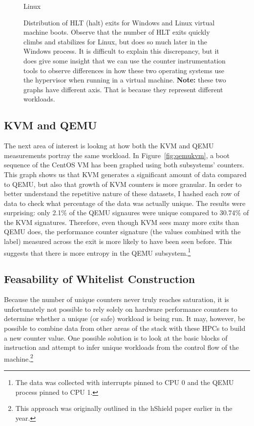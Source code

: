 \documentclass[notitlepage]{article}
\begin{document}
\begin{figure}[htpb!]
\begin{minipage}{0.5\textwidth}
        Linux
    \end{minipage}
    \caption{Distribution of HLT (halt) exits for Windows and Linux virtual
        machine boots. Observe that the number of HLT exits quickly climbs and
        stabilizes for Linux, but does so much later in the Windows process. It
        is difficult to explain this discrepancy, but it does give some insight
        that we can use the counter instrumentation tools to observe differences
        in how these two operating systems use the hypervisor when running in a
        virtual machine. \textbf{Note:} these two graphs have different axis.
    That is because they represent different workloads.} \label{fig:winlinhlt}
\end{figure}

\subsection{KVM and QEMU}
The next area of interest is lookng at how both the KVM and QEMU measurements
portray the same workload. In Figure~\ref{fig:qemukvm}, a boot sequence of the
CentOS VM has been graphed using both subsystems' counters. This graph shows us
that KVM generates a significant amount of data compared to QEMU, but also that
growth of KVM counters is more granular. In order to better understand the
repetitive nature of these datasets, I hashed each row of data to check what
percentage of the data was actually unique. The results were surprising: only
2.1\% of the QEMU signaures were unique compared to 30.74\% of the KVM
signatures. Therefore, even though KVM sees many more exits than QEMU does, the
performance counter signature (the values combined with the label) measured
across the exit is more likely to have been seen before. This suggests that
there is more entropy in the QEMU subsystem.\footnote{The data was collected with
    interrupts pinned to CPU 0 and the QEMU process pinned to CPU 1.}

\subsection{Feasability of Whitelist Construction}
Because the number of unique counters never truly reaches saturation, it is
unfortunately not possible to rely solely on hardware performance counters to
determine whether a unique (or safe) workload is being run. It may, however, be
possible to combine data from other areas of the stack with these HPCs to build
a new counter value. One possible solution is to look at the basic blocks of
instruction and attempt to infer unique workloads from the control flow of the
machine.\footnote{This approach was
originally outlined in the hShield paper earlier in the year.}
\end{document}
